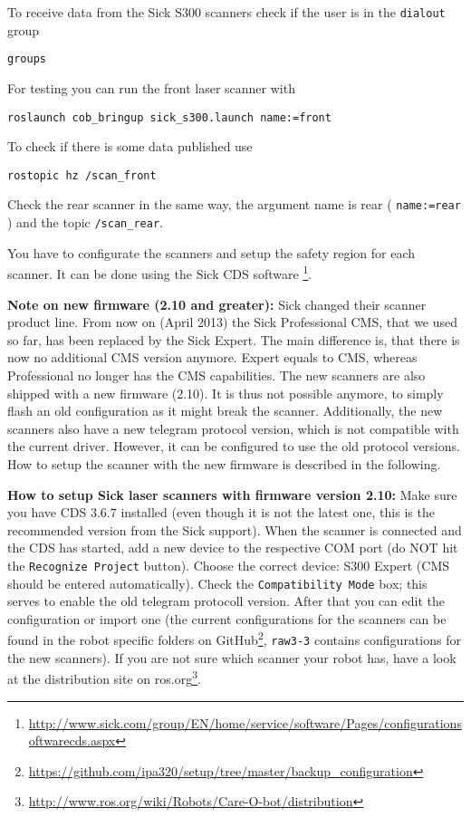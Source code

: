 To receive data from the Sick S300 scanners check if the user is in the \texttt{dialout} group
\begin{lstlisting}
groups
\end{lstlisting}

For testing you can run the front laser scanner with
\begin{lstlisting}
roslaunch cob_bringup sick_s300.launch name:=front
\end{lstlisting}

To check if there is some data published use
\begin{lstlisting}
rostopic hz /scan_front
\end{lstlisting}

Check the rear scanner in the same way, the argument name is rear ( \texttt{name:=rear} ) and the topic \texttt{/scan\_rear}.

You have to configurate the scanners and setup the safety region for each scanner. It can be done using the Sick CDS software \footnote{\url{http://www.sick.com/group/EN/home/service/software/Pages/configurationsoftwarecds.aspx}}.

\textbf{Note on new firmware (2.10 and greater):} 
Sick changed their scanner product line. From now on (April 2013) the Sick Professional CMS, that we used so far, has been replaced by the Sick Expert.
The main difference is, that there is now no additional CMS version anymore.
Expert equals to CMS, whereas Professional no longer has the CMS capabilities.
The new scanners are also shipped with a new firmware (2.10).
It is thus not possible anymore, to simply flash an old configuration as it might break the scanner.
Additionally, the new scanners also have a new telegram protocol version, which is not compatible with the current driver.
However, it can be configured to use the old protocol versions.
How to setup the scanner with the new firmware is described in the following.

\textbf{How to setup Sick laser scanners with firmware version 2.10:}
Make sure you have CDS 3.6.7 installed (even though it is not the latest one, this is the recommended version from the Sick support).
When the scanner is connected and the CDS has started, add a new device to the respective COM port (do NOT hit the \texttt{Recognize Project} button).
Choose the correct device: S300 Expert (CMS should be entered automatically).
Check the \texttt{Compatibility Mode} box; this serves to enable the old telegram protocoll version.
After that you can edit the configuration or import one (the current configurations for the scanners can be found in the robot specific folders on GitHub\footnote{\url{https://github.com/ipa320/setup/tree/master/backup_configuration}}, \texttt{raw3-3} contains configurations for the new scanners).
If you are not sure which scanner your robot has, have a look at the distribution site on ros.org\footnote{\url{http://www.ros.org/wiki/Robots/Care-O-bot/distribution}}.

